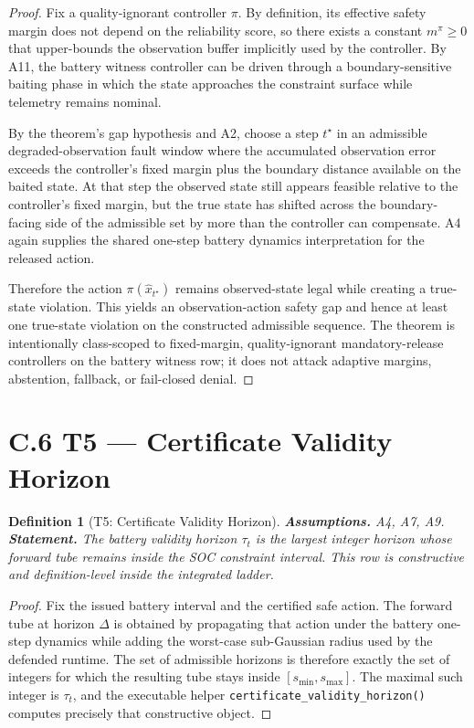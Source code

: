 \documentclass[11pt]{article}
\newtheorem{definition}[theorem]{Definition}
\newcommand{\1}{\mathbf{1}}
\begin{document}
\begin{proof}
Fix a quality-ignorant controller $\pi$. By definition, its effective safety
margin does not depend on the reliability score, so there exists a constant
$m^\pi \ge 0$ that upper-bounds the observation buffer implicitly used by the
controller. By A11, the battery witness controller can be driven through a
boundary-sensitive baiting phase in which the state approaches the constraint
surface while telemetry remains nominal.

By the theorem's gap hypothesis and A2, choose a step $t^\star$ in an
admissible degraded-observation fault window where the accumulated observation
error exceeds the controller's fixed margin plus the boundary distance
available on the baited state. At that step the observed state still appears
feasible relative to the controller's fixed margin, but the
true state has shifted across the boundary-facing side of the admissible set by
more than the controller can compensate. A4 again supplies the shared
one-step battery dynamics interpretation for the released action.

Therefore the action $\pi(\hat{x}_{t^\star})$ remains observed-state legal
while creating a true-state violation. This yields an observation-action safety
gap and hence at least one true-state violation on the constructed admissible
sequence. The theorem is intentionally class-scoped to fixed-margin,
quality-ignorant mandatory-release controllers on the battery witness row; it
does not attack adaptive margins, abstention, fallback, or fail-closed denial.
\qedhere
\end{proof}

\section*{C.6 T5 --- Certificate Validity Horizon}

\begin{definition}[T5: Certificate Validity Horizon]\label{thm:t5}
\textbf{Assumptions.} A4, A7, A9. \\
\textbf{Statement.} The battery validity horizon $\tau_t$ is the largest
integer horizon whose forward tube remains inside the SOC constraint interval.
This row is constructive and definition-level inside the integrated ladder.
\end{definition}

\begin{proof}
Fix the issued battery interval and the certified safe action.  The forward
tube at horizon $\Delta$ is obtained by propagating that action under the
battery one-step dynamics while adding the worst-case sub-Gaussian radius used
by the defended runtime.  The set of admissible horizons is therefore exactly
the set of integers for which the resulting tube stays inside
$[s_{\min}, s_{\max}]$.  The maximal such integer is $\tau_t$, and the
executable helper \texttt{certificate\_validity\_horizon()} computes precisely
that constructive object. \qedhere
\end{proof}
\end{document}
